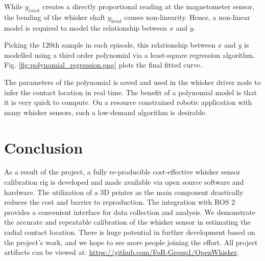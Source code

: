 \documentclass[runningheads]{llncs}
\begin{document}
While \(y_{twist}\) creates a directly proportional reading at the magnetometer sensor, the bending of the whisker shaft \(y_{bend}\) causes non-linearity. Hence, a non-linear model is required to model the relationship between \(x\) and \(\dot{y}\).

Picking the 120th sample in each episode, this relationship between \(x\) and \(\dot{y}\) is modelled using a third order polynomial via a least-square regression algorithm. Fig. \ref*{fig:polynomial_regression.png} plots the final fitted curve.

The parameters of the polynomial is saved and used in the whisker driver node to infer the contact location in real time. The benefit of a polynomial model is that it is very quick to compute. On a resource constrained robotic application with many whisker sensors, such a low-demand algorithm is desirable.

\section{Conclusion}

As a result of the project, a fully re-producible cost-effective whisker sensor calibration rig is developed and made available via open source software and hardware. The utilization of a 3D printer as the main component drastically reduces the cost and barrier to reproduction. The integration with ROS 2 provides a convenient interface for data collection and analysis. We demonstrate the accurate and repeatable calibration of the whisker sensor in estimating the radial contact location. There is huge potential in further development based on the project's work, and we hope to see more people joining the effort. All project artifacts can be viewed at: \url{https://github.com/FoR-Group1/OpenWhisker}.


\end{document}

